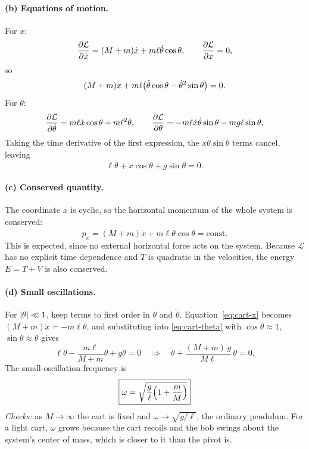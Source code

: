 \documentclass[11pt]{article}
\theoremstyle{definition}
\newcommand{\Lag}{\mathcal{L}}
\begin{document}
\paragraph{(b) Equations of motion.} For $x$:
\[
  \pdv{\Lag}{\dot x} = (M + m)\dot x + m\ell\dot\theta\cos\theta, \qquad \pdv{\Lag}{x} = 0,
\]
so
\begin{equation}
  (M + m)\ddot x + m\ell\qty(\ddot\theta\cos\theta - \dot\theta^2\sin\theta) = 0.
  \label{eq:cart-x}
\end{equation}
For $\theta$:
\[
  \pdv{\Lag}{\dot\theta} = m\ell\dot x\cos\theta + m\ell^2\dot\theta, \qquad
  \pdv{\Lag}{\theta} = -m\ell\dot x\dot\theta\sin\theta - mg\ell\sin\theta.
\]
Taking the time derivative of the first expression, the $\dot x\dot\theta\sin\theta$ terms cancel, leaving
\begin{equation}
  \ell\ddot\theta + \ddot x\cos\theta + g\sin\theta = 0.
  \label{eq:cart-theta}
\end{equation}

\paragraph{(c) Conserved quantity.} The coordinate $x$ is cyclic, so the horizontal momentum of the whole system is conserved:
\[
  p_x = (M + m)\dot x + m\ell\dot\theta\cos\theta = \text{const}.
\]
This is expected, since no external horizontal force acts on the system. Because $\Lag$ has no explicit time dependence and $T$ is quadratic in the velocities, the energy $E = T + V$ is also conserved.

\paragraph{(d) Small oscillations.} For $\abs{\theta} \ll 1$, keep terms to first order in $\theta$ and $\dot\theta$. Equation~\eqref{eq:cart-x} becomes $(M + m)\ddot x = -m\ell\ddot\theta$, and substituting into \eqref{eq:cart-theta} with $\cos\theta \approx 1$, $\sin\theta \approx \theta$ gives
\[
  \ell\ddot\theta - \frac{m\ell}{M + m}\ddot\theta + g\theta = 0
  \quad\Longrightarrow\quad
  \ddot\theta + \frac{(M + m)\,g}{M\ell}\,\theta = 0.
\]
The small-oscillation frequency is
\begin{equation}
  \boxed{\omega = \sqrt{\frac{g}{\ell}\qty(1 + \frac{m}{M})}}
\end{equation}
\emph{Checks:} as $M \to \infty$ the cart is fixed and $\omega \to \sqrt{g/\ell}$, the ordinary pendulum. For a light cart, $\omega$ grows because the cart recoils and the bob swings about the system's center of mass, which is closer to it than the pivot is.
\end{document}

